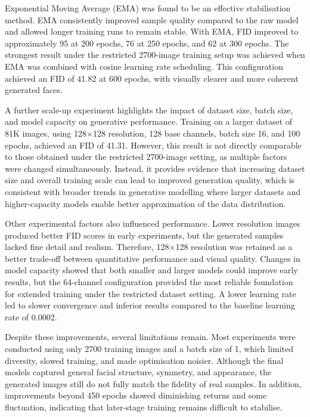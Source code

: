 \documentclass[conference]{IEEEtran}
\begin{document}
Exponential Moving Average (EMA) was found to be an effective stabilisation method. EMA consistently improved sample quality compared to the raw model and allowed longer training runs to remain stable. With EMA, FID improved to approximately 95 at 200 epochs, 76 at 250 epochs, and 62 at 300 epochs. The strongest result under the restricted 2700-image training setup was achieved when EMA was combined with cosine learning rate scheduling. This configuration achieved an FID of 41.82 at 600 epochs, with visually clearer and more coherent generated faces.

A further scale-up experiment highlights the impact of dataset size, batch size, and model capacity on generative performance. Training on a larger dataset of 81K images, using 128$\times$128 resolution, 128 base channels, batch size 16, and 100 epochs, achieved an FID of 41.31. However, this result is not directly comparable to those obtained under the restricted 2700-image setting, as multiple factors were changed simultaneously. Instead, it provides evidence that increasing dataset size and overall training scale can lead to improved generation quality, which is consistent with broader trends in generative modelling where larger datasets and higher-capacity models enable better approximation of the data distribution.

Other experimental factors also influenced performance. Lower resolution images produced better FID scores in early experiments, but the generated samples lacked fine detail and realism. Therefore, 128$\times$128 resolution was retained as a better trade-off between quantitative performance and visual quality. Changes in model capacity showed that both smaller and larger models could improve early results, but the 64-channel configuration provided the most reliable foundation for extended training under the restricted dataset setting. A lower learning rate led to slower convergence and inferior results compared to the baseline learning rate of 0.0002.

Despite these improvements, several limitations remain. Most experiments were conducted using only 2700 training images and a batch size of 1, which limited diversity, slowed training, and made optimisation noisier. Although the final models captured general facial structure, symmetry, and appearance, the generated images still do not fully match the fidelity of real samples. In addition, improvements beyond 450 epochs showed diminishing returns and some fluctuation, indicating that later-stage training remains difficult to stabilise.
\end{document}
